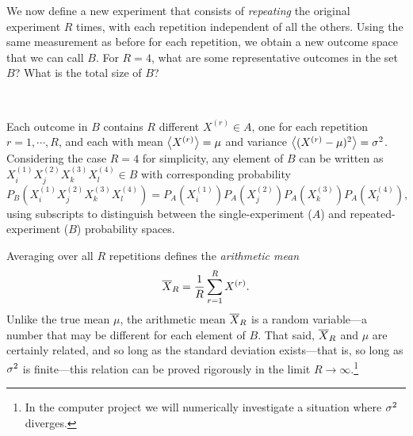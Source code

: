 We now define a new experiment that consists of \textit{repeating} the original experiment $R$ times, with each repetition independent of all the others.
Using the same measurement as before for each repetition, we obtain a new outcome space that we can call $B$.
For $R = 4$, what are some representative outcomes in the set $B$?
What is the total size of $B$?
\begin{mdframed}
  \ \\[100 pt]
\end{mdframed}

Each outcome in $B$ contains $R$ different $X^{(r)} \in A$, one for each repetition $r = 1, \cdots, R$, and each with mean $\left\langle X^{(r)} \right\rangle = \mu$ and variance $\left\langle (X^{(r)} - \mu)^2 \right\rangle = \sigma^2$.
Considering the case $R = 4$ for simplicity, any element of $B$ can be written as $X_i^{(1)} X_j^{(2)} X_k^{(3)} X_l^{(4)} \in B$ with corresponding probability
\begin{equation*}
  P_B\left(X_i^{(1)} X_j^{(2)} X_k^{(3)} X_l^{(4)}\right) = P_A\left(X_i^{(1)}\right) P_A\left(X_j^{(2)}\right) P_A\left(X_k^{(3)}\right) P_A\left(X_l^{(4)}\right),
\end{equation*}
using subscripts to distinguish between the single-experiment ($A$) and repeated-experiment ($B$) probability spaces.

Averaging over all $R$ repetitions defines the \textit{arithmetic mean}
\begin{equation}
  \label{eq:ave}
  \overline X_R = \frac{1}{R} \sum_{r = 1}^R X^{(r)}.
\end{equation}
Unlike the true mean $\mu$, the arithmetic mean $\overline X_R$ is a random variable---a number that may be different for each element of $B$.
That said, $\overline X_R$ and $\mu$ are certainly related, and so long as the standard deviation exists---that is, so long as $\sigma^2$ is finite---this relation can be proved rigorously in the limit $R \to \infty$.\footnote{In the computer project we will numerically investigate a situation where $\sigma^2$ diverges.}

